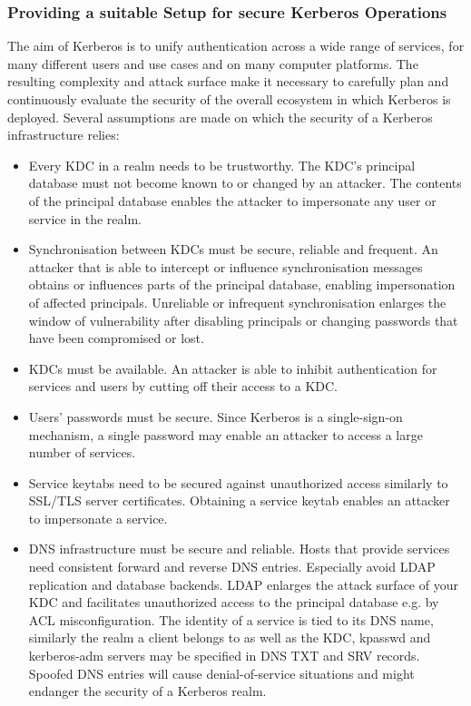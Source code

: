 \subsubsection{Providing a suitable Setup for secure Kerberos Operations}
\label{subsubsection:kerberos_secure_setup}

The aim of Kerberos is to unify authentication across a wide range of services, for many different users and use cases and on many computer platforms. The resulting complexity and attack surface make it necessary to carefully plan and continuously evaluate the security of the overall ecosystem in which Kerberos is deployed. Several assumptions are made on which the security of a Kerberos infrastructure relies:
\begin{itemize}
	\item Every KDC in a realm needs to be trustworthy. The KDC's principal database must not become known to or changed by an attacker. The contents of the principal database enables the attacker to impersonate any user or service in the realm.
	\item Synchronisation between KDCs must be secure, reliable and frequent. An attacker that is able to intercept or influence synchronisation messages obtains or influences parts of the principal database, enabling impersonation of affected principals. Unreliable or infrequent synchronisation enlarges the window of vulnerability after disabling principals or changing passwords that have been compromised or lost.
	\item KDCs must be available. An attacker is able to inhibit authentication for services and users by cutting off their access to a KDC.
	\item Users' passwords must be secure. Since Kerberos is a single-sign-on mechanism, a single password may enable an attacker to access a large number of services.
	\item Service keytabs need to be secured against unauthorized access similarly to SSL/TLS server certificates. Obtaining a service keytab enables an attacker to impersonate a service.
	\item DNS infrastructure must be secure and reliable. Hosts that provide services need consistent forward and reverse DNS entries. Especially avoid LDAP replication and database backends. LDAP enlarges the attack surface of your KDC and facilitates unauthorized access to the principal database e.g. by ACL misconfiguration. The identity of a service is tied to its DNS name, similarly the realm a client belongs to as well as the KDC, kpasswd and kerberos-adm servers may be specified in DNS TXT and SRV records. Spoofed DNS entries will cause denial-of-service situations and might endanger the security of a Kerberos realm.

\end{itemize}
